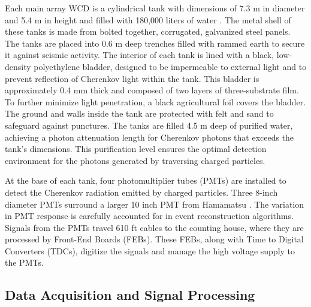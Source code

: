 Each main array WCD is a cylindrical tank with dimensions of 7.3 m in diameter and 5.4 m in height and filled with 180,000 liters of water \cite{HAWC_NIM}.
The metal shell of these tanks is made from bolted together, corrugated, galvanized steel panels.
The tanks are placed into 0.6 m deep trenches filled with rammed earth to secure it against seismic activity.
The interior of each tank is lined with a black, low-density polyethylene bladder, designed to be impermeable to external light and to prevent reflection of Cherenkov light within the tank.
This bladder is approximately 0.4 mm thick and composed of two layers of three-substrate film.
To further minimize light penetration, a black agricultural foil covers the bladder.
The ground and walls inside the tank are protected with felt and sand to safeguard against punctures.
The tanks are filled 4.5 m deep of purified water, achieving a photon attenuation length for Cherenkov photons that exceeds the tank's dimensions.
This purification level ensures the optimal detection environment for the photons generated by traversing charged particles.

At the base of each tank, four photomultiplier tubes (PMTs) are installed to detect the Cherenkov radiation emitted by charged particles.
Three 8-inch diameter PMTs surround a larger 10 inch PMT from Hamamatsu \cite{hawc_pmt}.
The variation in PMT response is carefully accounted for in event reconstruction algorithms.
Signals from the PMTs travel  610 ft cables to the counting house, where they are processed by Front-End Boards (FEBs).
These FEBs, along with Time to Digital Converters (TDCs), digitize the signals and manage the high voltage supply to the PMTs.

\subsection{Data Acquisition and Signal Processing} \label{sec:hawc_daq}

